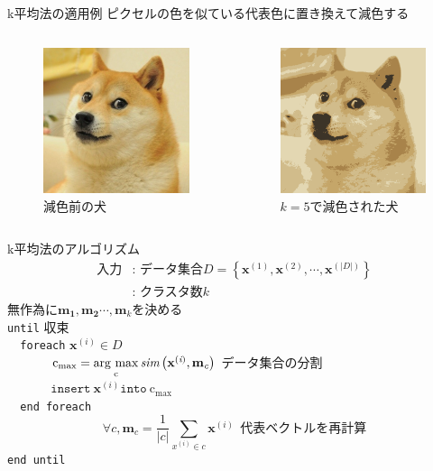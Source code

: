 \documentclass[dvipdfmx,platex]{beamer}
\newcommand{\argmax}{\mathop{\rm arg~max}\limits}
\begin{document}
\begin{frame}{{\mgfamily k平均法の適用例}}
  ピクセルの色を似ている代表色に置き換えて減色する
    \begin{columns}[T,onlytextwidth]
    \begin{figure}
      \centering
      \includegraphics[width=5cm]{fig/doge.png}
      \caption{{\mgfamily 減色前の犬}}
    \end{figure}
    \begin{figure}
      \centering
      \includegraphics[width=5cm]{fig/doge_q.png}
      \caption{$k=5${\mgfamily で減色された犬}}
    \end{figure}
  \end{columns}
\end{frame}
\begin{frame}{{\mgfamily k平均法のアルゴリズム}}
  \begin{align*}
    \text{入力}&\text{: データ集合}D=\left\{\mathbf{x}^{(1)},\mathbf{x}^{(2)},\cdots,\mathbf{x}^{(|D|)} \right\}\\
   &\text{: クラスタ数}k
  \end{align*}  
  無作為に$\mathbf{m_1}, \mathbf{m_2}\cdots,\mathbf{m_{\textit{k}}}$を決める\\
\texttt{until} 収束\\
\texttt{\ \ foreach} $\mathbf{x^{(\textit{i})}}\in D$\\
\textbf{\ \ \ \ \ \ }$\textrm{c}_{\textrm{max}} = \argmax_{\textrm{c}} \textit{\textrm{sim}}\left(\mathbf{x}^{(\textit{i})},\textbf{m}_{\textit{c}}\right)$ データ集合の分割\\
\textbf{\ \ \ \ \ \ }$\texttt{insert}\ \mathbf{x}^{(\textit{i})}\texttt{into}\ \textrm{c}_{\textrm{max}}$\\
\texttt{\ \ end\ foreach}
\[
\forall \textit{c}, \mathbf{m}_{\textit{c}}=\frac{1}{|\textit{c}|}\sum_{\textit{x}^{(i)}\in \textit{c}}\mathbf{x}^{(\textit{i})}\ \ \text{代表ベクトルを再計算}
\]
\texttt{end until}
\end{frame}
\end{document}
